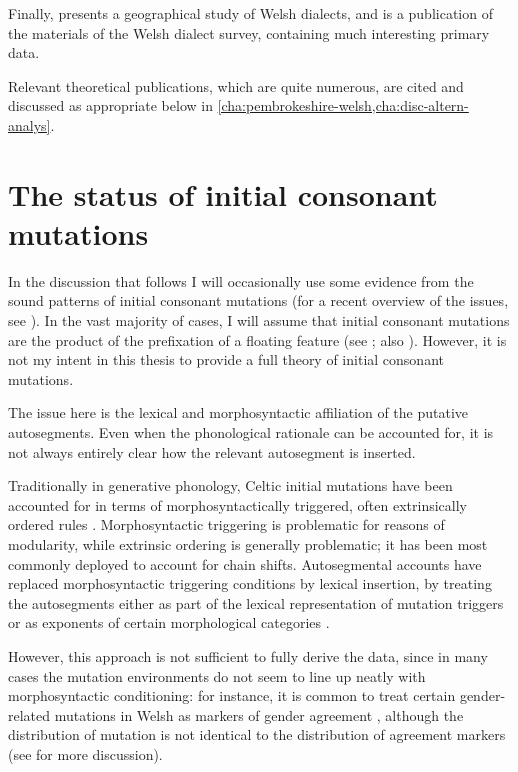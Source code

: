Finally, \citet{thomas73:_wales} presents a geographical study of Welsh dialects, and \citet{thomas00:_welsh} is a publication of the materials of the Welsh dialect survey, containing much interesting primary data.

Relevant theoretical publications, which are quite numerous, are cited and discussed as appropriate below in \cref{cha:pembrokeshire-welsh,cha:disc-altern-analys}.


\section{The status of initial consonant mutations}
\label{sec:stat-init-cons}

In the discussion that follows I will occasionally use some evidence from the sound patterns of initial consonant mutations (for a recent overview of the issues, see \citealp{hannahs11:_celtic}). In the vast majority of cases, I will assume that initial consonant mutations are the product of the prefixation of a floating feature (see \citealp{lieber,lieberbook,swingle,wolf2005,wolf-forautosegs}; \cf also \citealp{hamp,roberts}). However, it is not my intent in this thesis to provide a full theory of initial consonant mutations.

The issue here is the lexical and morphosyntactic affiliation of the putative autosegments. Even when the phonological rationale can be accounted for, it is not always entirely clear how the relevant autosegment is inserted.

Traditionally in generative phonology, Celtic initial mutations have been accounted for in terms of morphosyntactically triggered, often extrinsically ordered rules \citep[\egm][]{rogers,kibre}. Morphosyntactic triggering is problematic for reasons of modularity, while extrinsic ordering is generally problematic; it has been most commonly deployed to account for chain shifts. Autosegmental accounts have replaced morphosyntactic triggering conditions by lexical insertion, by treating the autosegments either as part of the lexical representation of mutation triggers or as exponents of certain morphological categories \citep[\cfm][]{swingle,wolf-forautosegs}.

However, this approach is not sufficient to fully derive the data, since in many cases the mutation environments do not seem to line up neatly with morphosyntactic conditioning: for instance, it is common to treat certain gender\hyp related mutations in Welsh as markers of gender agreement \citep[\egm][]{kibre}, although the distribution of mutation is not identical to the distribution of agreement markers (see \citealp{leipzig} for more discussion).

